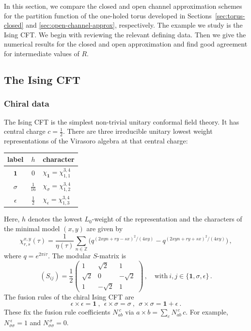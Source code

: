 \documentclass[11pt,a4paper]{article}
\numberwithin{equation}{section}
\newcommand{\one}{\mathbf{1}} %
\begin{document}
In this section, we compare the closed and open channel approximation schemes for the partition function of the one-holed torus developed in Sections~\ref{sec:torus-closed} and \ref{sec:open-channel-approx}, respectively.
The example we study is the Ising CFT. We begin with reviewing the relevant defining data. Then we give the numerical results for the closed and open approximation and find good agreement for intermediate values of $R$.

\subsection{The Ising CFT}\label{sec:IsingIntro}

\subsubsection*{Chiral data}

The Ising CFT is the simplest non-trivial unitary conformal field theory. It has central charge $c=\tfrac{1}{2}$. There are three irreducible unitary lowest weight representations of the Virasoro algebra at that central charge:
\begin{center}
{\def\arraystretch{1.4}
		\begin{tabular}{ccl}
		label & $h$ & character 
		\\ \hline
		$\one$  & 0 & $\chi_\one = \chi_{1,1}^{3,4}$
		\\
		$\sigma$  & $\frac1{16}$ & $\chi_\sigma = \chi_{1,2}^{3,4}$
		\\
		$\epsilon$  & $\frac12$ & $\chi_\epsilon = \chi_{1,3}^{3,4}$
	\end{tabular}
}
\end{center}
Here, $h$ denotes the lowest $L_0$-weight of the representation and the characters of the minimal model $(x,y)$ are given by \cite[Eq.\,(8.17)]{DiFrancesco:1997nk}
%
\begin{equation}
	\chi^{x,y}_{r,s}(\tau) = \frac{1}{\eta(\tau)} \sum_{n\in\mathbb{Z}} \Big(
	q^{(2 x y n + r y - s x)^2 / (4 x y)} 
	- q^{(2 x y n + r y  + s x)^2/(4 x y)} \Big)\,,
\end{equation}
%
where $q = e^{2 \pi i \tau}$. The modular $S$-matrix is
%
\begin{equation} \label{eq:Ising-S}
	(S_{ij}) = \frac{1}{2} 
	\begin{pmatrix}
		1&\sqrt{2}& 1\\ 
		\sqrt{2} & 0 & -\sqrt{2} \\
		1 & -\sqrt{2} & 1 
	\end{pmatrix}\,,\quad \text{with}~ i,j\in \{\one,\sigma,\epsilon\}\,.
\end{equation}
The fusion rules of the chiral Ising CFT are
\begin{equation}
	\epsilon \times \epsilon = \one
	~,~~
	\epsilon \times \sigma = \sigma
~,~~
	\sigma \times \sigma = \one + \epsilon ~.
\end{equation}
These fix the fusion rule coefficients $N_{ab}^{~c}$ via $a \times b = \sum_c N_{ab}^{~c} \, c$. For example, $N_{\sigma\sigma}^{~\epsilon}=1$ and $N_{\sigma\sigma}^{~\sigma}=0$. 
\end{document}

